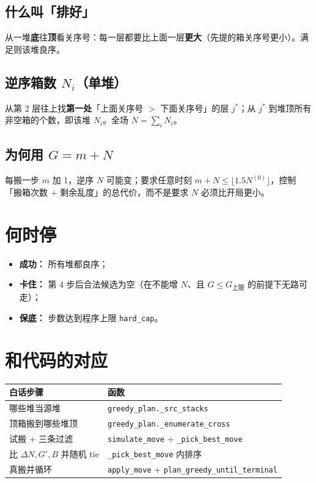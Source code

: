 \documentclass[11pt,a4paper]{ctexart}
\newcommand{\capG}{G_{\mathrm{上限}}}
\begin{document}
\subsection{什么叫「排好」}

从一堆\textbf{底}往\textbf{顶}看关序号：每一层都要比上面一层\textbf{更大}（先提的箱关序号更小）。满足则该堆良序。

\subsection{逆序箱数 $N_i$（单堆）}

从第 2 层往上找\textbf{第一处}「上面关序号 $>$ 下面关序号」的层 $j^\ast$；从 $j^\ast$ 到堆顶所有非空箱的个数，即该堆 $N_i$。全场 $N=\sum_i N_i$。

\subsection{为何用 $G=m+N$}

每搬一步 $m$ 加 1，逆序 $N$ 可能变；要求任意时刻 $m+N \le \lfloor 1.5 N^{(0)}\rfloor$，控制「搬箱次数 + 剩余乱度」的总代价，而不是要求 $N$ 必须比开局更小。

\section{何时停}

\begin{itemize}
  \item \textbf{成功：} 所有堆都良序；
  \item \textbf{卡住：} 第 4 步后合法候选为空（在不能增 $N$、且 $G\le\capG$ 的前提下无路可走）；
  \item \textbf{保底：} 步数达到程序上限 \texttt{hard\_cap}。
\end{itemize}

\section{和代码的对应}

\begin{table}[h]
  \centering
  \begin{tabular}{p{5.5cm}p{6.5cm}}
    \toprule
    白话步骤 & 函数 \\
    \midrule
    哪些堆当源堆 & \texttt{greedy\_plan.\_src\_stacks} \\
    顶箱搬到哪些堆顶 & \texttt{greedy\_plan.\_enumerate\_cross} \\
    试搬 + 三条过滤 & \texttt{simulate\_move} + \texttt{\_pick\_best\_move} \\
    比 $\Delta N,G',B$ 并随机 tie & \texttt{\_pick\_best\_move} 内排序 \\
    真搬并循环 & \texttt{apply\_move} + \texttt{plan\_greedy\_until\_terminal} \\
    \bottomrule
  \end{tabular}
\end{table}
\end{document}
